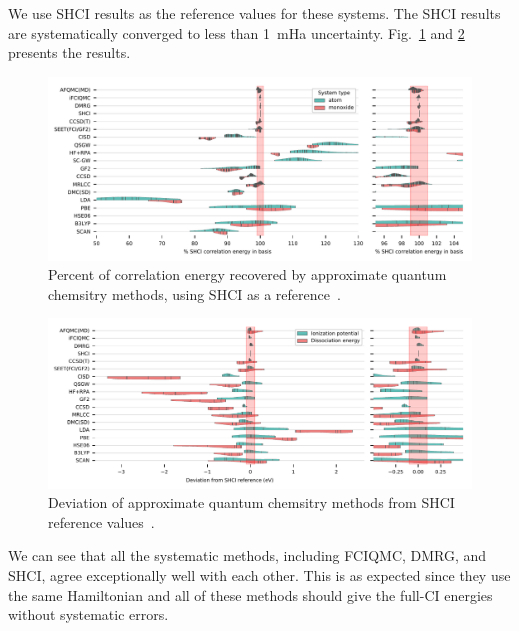We use SHCI results as the reference values for these systems.
The SHCI results are systematically converged to less than 1~mHa uncertainty.
Fig.~\ref{fig:benchmark} and \ref{fig:benchmark_be} presents the results.

\begin{figure}
  \begin{center}
  \includegraphics[width=\linewidth]{figs/correlation_energybar.pdf}
  \caption{Percent of correlation energy recovered by approximate quantum chemsitry methods, using SHCI as a reference~\cite{williams2019direct}.
}
  \label{fig:benchmark}
  \end{center}
\end{figure}

\begin{figure}
  \begin{center}
  \includegraphics[width=\linewidth]{figs/BE_IP_SHCI.pdf}
  \caption{Deviation of approximate quantum chemsitry methods from SHCI reference values~\cite{williams2019direct}.
}
  \label{fig:benchmark_be}
  \end{center}
\end{figure}

We can see that all the systematic methods, including FCIQMC, DMRG, and SHCI, agree exceptionally well with each other.
This is as expected since they use the same Hamiltonian and all of these methods should give the full-CI energies without systematic errors.

